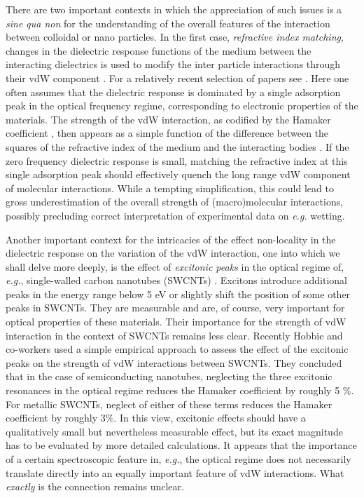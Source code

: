 \documentclass[letterpaper,twocolumn,amsmath,amssymb,floatfix,aps,superscriptaddress]{revtex4}
\begin{document}
There are two important contexts in which the appreciation of such issues is a {\sl sine qua non} for the
understanding of the overall features of the interaction between colloidal or nano particles. In the first case, {\sl refractive index matching}, changes in the dielectric response functions of the medium between the interacting dielectrics is used to modify the inter particle interactions through their vdW component . For a relatively recent selection of papers see \cite{Blaaderen,Chaikin,Bonn,Shen,Manohar}.  Here one often assumes that the dielectric response is dominated by a single adsorption peak in the optical frequency regime, corresponding to electronic properties of the materials. The strength of the vdW interaction, as codified by the Hamaker coefficient \cite{Parsegian}, then appears as a simple function of the difference between the squares of the refractive index of the medium and the interacting bodies \cite{Isrealachvili}. If the zero frequency dielectric response is small, matching the refractive index at this single adsorption peak should effectively quench the long range vdW component of molecular interactions. While a tempting simplification, this could lead to gross underestimation of the overall strength of (macro)molecular interactions, possibly precluding correct interpretation of experimental data on {\sl e.g.} wetting.

Another important context for the intricacies of the effect non-locality in the dielectric response  on the variation of the vdW interaction, one into which we shall delve more deeply, is the effect of {\sl excitonic peaks} in the optical regime of, {\sl e.g.},  single-walled carbon nanotubes (SWCNTs) \cite{CNTexciton}. Excitons introduce additional peaks in  the energy range below 5 eV or slightly shift the position of some other peaks in SWCNTs. They are measurable \cite{Measurable} and are, of course, very important  for optical properties of these materials. Their importance for the strength of vdW interaction in the context of SWCNTs remains less clear. Recently Hobbie and co-workers \cite{Hobbie} used a simple empirical approach to assess the effect of the excitonic peaks on the strength of vdW interactions between SWCNTs. They concluded that in the case of semiconducting nanotubes, neglecting the three excitonic resonances in the optical regime reduces the Hamaker coefficient by roughly 5 \%. For metallic SWCNTs, neglect of either of these terms reduces the Hamaker coefficient by roughly 3\%. In this view, excitonic effects should have a qualitatively small but nevertheless measurable effect, but its exact magnitude has to be evaluated by more detailed calculations. It appears that the importance of a certain spectroscopic feature in, {\sl e.g.}, the optical regime does not necessarily translate directly into an equally important feature of vdW interactions. What {\sl exactly} is the connection remains unclear.
\end{document}
